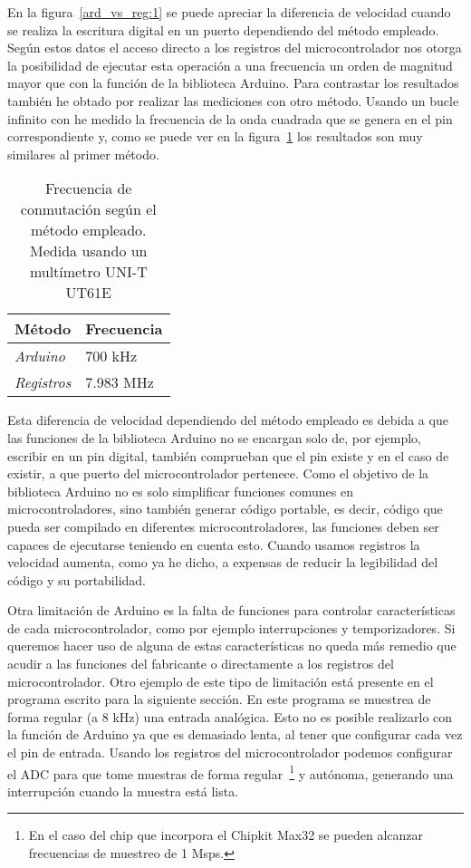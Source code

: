 En la figura~\ref{ard_vs_reg:1} se puede apreciar la diferencia de velocidad cuando se realiza la escritura digital en un puerto dependiendo del método empleado. Según estos datos el acceso directo a los registros del microcontrolador nos otorga la posibilidad de ejecutar esta operación a una frecuencia un orden de magnitud mayor que con la función  de la biblioteca Arduino. Para contrastar los resultados también he obtado por realizar las mediciones con otro método. Usando un bucle infinito con  he medido la frecuencia de la onda cuadrada que se genera en el pin correspondiente y, como se puede ver en la figura~\ref{ard_vs_reg:2} los resultados son muy similares al primer método.

\begin{table}[htb]
	\begin{center}
		\begin{tabular}{ll}
      \textbf{Método}		&		\textbf{Frecuencia}	\\
			\hline
      \textit{Arduino}		&		700 kHz			\\
      \textit{Registros}	&		7.983	MHz		\\
		\end{tabular}
	\end{center}
	\caption{Frecuencia de conmutación según el método empleado. Medida usando un multímetro UNI-T UT61E}
	\label{ard_vs_reg:2}
\end{table}

Esta diferencia de velocidad dependiendo del método empleado es debida a que las funciones de la biblioteca Arduino no se encargan solo de, por ejemplo, escribir en un pin digital, también comprueban que el pin existe y en el caso de existir, a que puerto del microcontrolador pertenece. Como el objetivo de la biblioteca Arduino no es solo simplificar funciones comunes en microcontroladores, sino también generar código portable, es decir, código que pueda ser compilado en diferentes microcontroladores, las funciones deben ser capaces de ejecutarse teniendo en cuenta esto. Cuando usamos registros la velocidad aumenta, como ya he dicho, a expensas de reducir la legibilidad del código y su portabilidad.

Otra limitación de Arduino es la falta de funciones para controlar características de cada microcontrolador, como por ejemplo interrupciones y temporizadores. Si queremos hacer uso de alguna de estas características no queda más remedio que acudir a las funciones del fabricante o directamente a los registros del microcontrolador. Otro ejemplo de este tipo de limitación está presente en el programa escrito para la siguiente sección. En este programa se muestrea de forma regular (a 8 kHz) una entrada analógica. Esto no es posible realizarlo con la función de Arduino  ya que es demasiado lenta, al tener que configurar cada vez el pin de entrada. Usando los registros del microcontrolador podemos configurar el ADC para que tome muestras de forma regular~\footnote{En el caso del chip que incorpora el Chipkit Max32 se pueden alcanzar frecuencias de muestreo de 1 Msps.} y autónoma, generando una interrupción cuando la muestra está lista.

